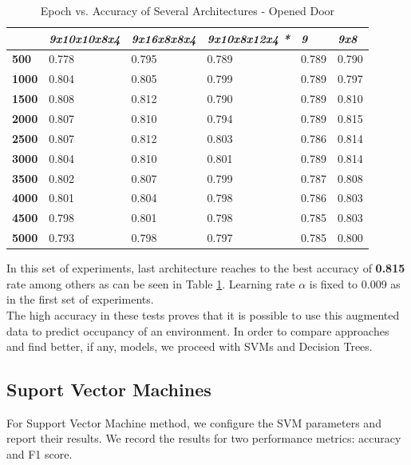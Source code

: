 \documentclass[conference]{IEEEtran}
\begin{document}
\begin{table}[H]
	\centering
	\caption{Epoch vs. Accuracy of Several Architectures - Opened Door}
	\label{AllArches2}
	\begin{tabular}{|l|l|l|l|l|l|}
		\hline
		& \textit{9x10x10x8x4} 
		& \textit{9x16x8x8x4}
		& \textit{9x10x8x12x4 \textbf{*}}
		& \textit{9}
		& \textit{9x8}\\ \hline
		\textbf{500} & 0.778 & 0.795 & 0.789 & 0.789 & 0.790\\ \hline
		\textbf{1000} & 0.804 & 0.805 & 0.799 & 0.789 & 0.797\\
		\hline
		\textbf{1500} & 0.808 & 0.812 & 0.790 & 0.789 & 0.810\\ \hline
		\textbf{2000} & 0.807& 0.810 & 0.794 & 0.789 & \cellcolor{green!25}0.815\\ \hline
		\textbf{2500} & 0.807 & 0.812 & 0.803 &  0.786 & 0.814\\
		\hline
		\textbf{3000} & 0.804 & 0.810 & 0.801 & 0.789 & 0.814\\ \hline
		\textbf{3500} & 0.802 & 0.807 & 0.799 & 0.787 & 0.808\\ \hline
		\textbf{4000} & 0.801 & 0.804 & 0.798 & 0.786 & 0.803\\ \hline
		\textbf{4500} & 0.798 & 0.801 & 0.798 & 0.785 & 0.803\\ \hline
		\textbf{5000} & 0.793 &  0.798 & 0.797 & 0.785 & 0.800\\ \hline
	\end{tabular}
\end{table}

In this set of experiments, last architecture reaches to the best accuracy of \textbf{0.815 }rate among others as can be seen in Table \ref{AllArches2}. Learning rate $\alpha$ is fixed to 0.009 as in the first set of experiments.\\

The high accuracy in these tests proves that it is possible to use
this augmented data to predict occupancy of an environment. In order to compare approaches and find better, if any, models, we proceed with SVMs and Decision Trees.

\subsection{Suport Vector Machines}
For Support Vector Machine method, we configure the SVM parameters and report their results. We record the results for two performance metrics: accuracy and F1 score.\\
\end{document}
